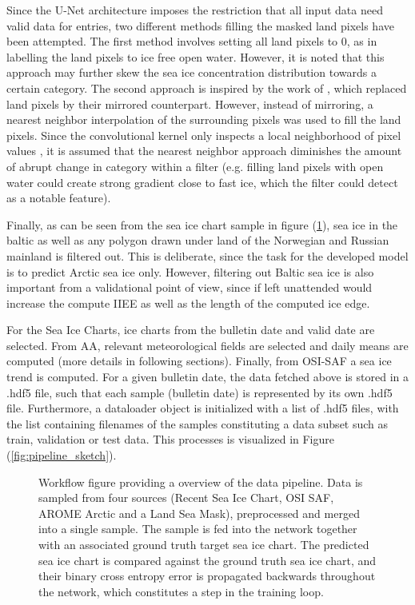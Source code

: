 \documentclass[../main/thesis]{subfiles}
\begin{document}
Since the U-Net architecture imposes the restriction that all input data need valid data for entries, two different methods filling the masked land pixels have been attempted. The first method involves setting all land pixels to 0, as in labelling the land pixels to ice free open water. However, it is noted that this approach may further skew the sea ice concentration distribution towards a certain category. The second approach is inspired by the work of \citet{Wang2017}, which replaced land pixels by their mirrored counterpart. However, instead of mirroring, a nearest neighbor interpolation of the surrounding pixels was used to fill the land pixels. Since the convolutional kernel only inspects a local neighborhood of pixel values \citep{Yamashita2018}, it is assumed that the nearest neighbor approach diminishes the amount of abrupt change in category within a filter (e.g. filling land pixels with open water could create strong gradient close to fast ice, which the filter could detect as a notable feature).

Finally, as can be seen from the sea ice chart sample in figure (\ref{fig:data_pipeline}), sea ice in the baltic as well as any polygon drawn under land of the Norwegian and Russian mainland is filtered out. This is deliberate, since the task for the developed model is to predict Arctic sea ice only. However, filtering out Baltic sea ice is also important from a validational point of view, since if left unattended would increase the compute IIEE as well as the length of the computed ice edge. 







For the Sea Ice Charts, ice charts from the bulletin date and valid date are selected. From AA, relevant meteorological fields are selected and daily means are computed (more details in following sections). Finally, from OSI-SAF a sea ice trend is computed. For a given bulletin date, the data fetched above is stored in a .hdf5 file, such that each sample (bulletin date) is represented by its own .hdf5 file. Furthermore, a dataloader object is initialized with a list of .hdf5 files, with the list containing filenames of the samples constituting a data subset such as train, validation or test data. This processes is visualized in Figure (\ref{fig:pipeline_sketch}).

\begin{figure}
    \centering
    
    \caption{\label{fig:data_pipeline} Workflow figure providing a overview of the data pipeline. Data is sampled from four sources (Recent Sea Ice Chart, OSI SAF, AROME Arctic and a Land Sea Mask), preprocessed and merged into a single sample. The sample is fed into the network  together with an associated ground truth target sea ice chart. The predicted sea ice chart is compared against the ground truth sea ice chart, and their binary cross entropy error is propagated backwards throughout the network, which constitutes a step in the training loop.}
\end{figure}
\end{document}
